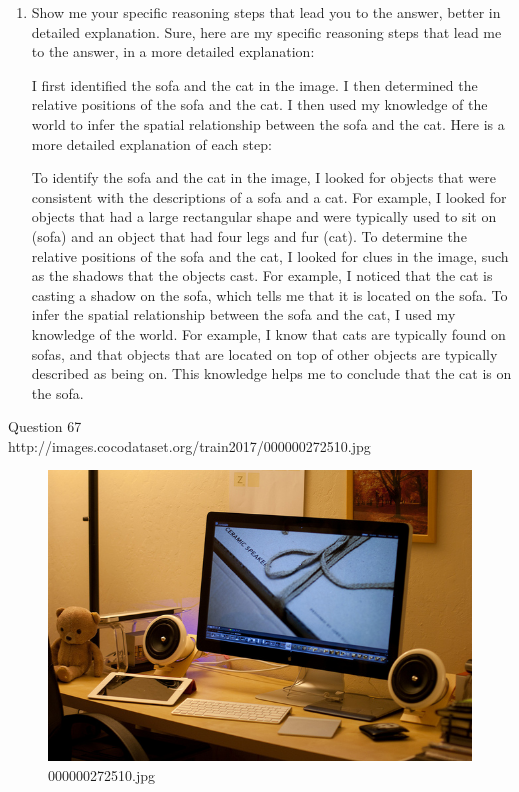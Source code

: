 \begin{enumerate}
    Here are some additional details about the spatial relationship between the sofa and the cat:
    
    The sofa is a piece of furniture that is used to sit on.
    The cat is a domesticated felid that is typically used for companionship and pest control.
    The cat is located on the sofa, meaning that it is resting on the sofa.
    The sofa is located on the floor, meaning that it is not touching any walls.
    Is there anything else I can help you with?
    \item Show me your specific reasoning steps that lead you to the answer, better in detailed explanation.
    \subitem 
    Sure, here are my specific reasoning steps that lead me to the answer, in a more detailed explanation:
    
    I first identified the sofa and the cat in the image.
    I then determined the relative positions of the sofa and the cat.
    I then used my knowledge of the world to infer the spatial relationship between the sofa and the cat.
    Here is a more detailed explanation of each step:
    
    To identify the sofa and the cat in the image, I looked for objects that were consistent with the descriptions of a sofa and a cat. For example, I looked for objects that had a large rectangular shape and were typically used to sit on (sofa) and an object that had four legs and fur (cat).
    To determine the relative positions of the sofa and the cat, I looked for clues in the image, such as the shadows that the objects cast. For example, I noticed that the cat is casting a shadow on the sofa, which tells me that it is located on the sofa.
    To infer the spatial relationship between the sofa and the cat, I used my knowledge of the world. For example, I know that cats are typically found on sofas, and that objects that are located on top of other objects are typically described as being on. This knowledge helps me to conclude that the cat is on the sofa.
\end{enumerate}
Question 67\\
http://images.cocodataset.org/train2017/000000272510.jpg
\begin{figure}[h]
    \centering
    \includegraphics[width=0.8\linewidth]{../image set/hard/000000272510.jpg}
    \caption{000000272510.jpg}
\end{figure}
